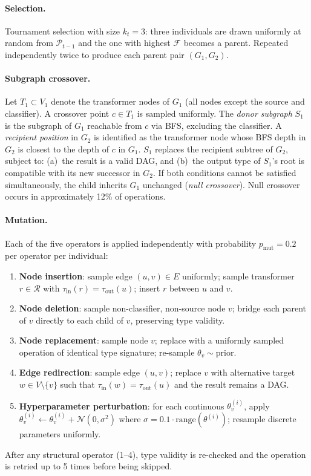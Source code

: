 \documentclass{article}
\theoremstyle{definition}
\theoremstyle{plain}
\theoremstyle{remark}
\begin{document}
\paragraph{Selection.}
Tournament selection with size $k_t = 3$: three individuals are drawn
uniformly at random from $\mathcal{P}_{t-1}$ and the one with highest
$\mathcal{F}$ becomes a parent.
Repeated independently twice to produce each parent pair $(G_1, G_2)$.

\paragraph{Subgraph crossover.}
Let $T_1 \subset V_1$ denote the transformer nodes of $G_1$
(all nodes except the source and classifier).
A crossover point $c \in T_1$ is sampled uniformly.
The \emph{donor subgraph} $S_1$ is the subgraph of $G_1$ reachable from
$c$ via BFS, excluding the classifier.
A \emph{recipient position} in $G_2$ is identified as the transformer node
whose BFS depth in $G_2$ is closest to the depth of $c$ in $G_1$.
$S_1$ replaces the recipient subtree of $G_2$, subject to:
(a)~the result is a valid DAG, and
(b)~the output type of $S_1$'s root is compatible with its new successor in $G_2$.
If both conditions cannot be satisfied simultaneously, the child inherits
$G_1$ unchanged (\emph{null crossover}).
Null crossover occurs in approximately 12\% of operations.

\paragraph{Mutation.}
Each of the five operators is applied independently with probability
$p_{\mathrm{mut}} = 0.2$ per operator per individual:
\begin{enumerate}
  \item \textbf{Node insertion}: sample edge $(u,v) \in E$ uniformly; sample
        transformer $r \in \mathcal{R}$ with $\tau_{\mathrm{in}}(r) =
        \tau_{\mathrm{out}}(u)$; insert $r$ between $u$ and $v$.
  \item \textbf{Node deletion}: sample non-classifier, non-source node $v$;
        bridge each parent of $v$ directly to each child of $v$, preserving
        type validity.
  \item \textbf{Node replacement}: sample node $v$; replace with a uniformly
        sampled operation of identical type signature; re-sample
        $\theta_v \sim \mathrm{prior}$.
  \item \textbf{Edge redirection}: sample edge $(u,v)$; replace $v$ with
        alternative target $w \in V \setminus \{v\}$ such that
        $\tau_{\mathrm{in}}(w) = \tau_{\mathrm{out}}(u)$ and the result
        remains a DAG.
  \item \textbf{Hyperparameter perturbation}: for each continuous
        $\theta^{(i)}_v$, apply $\theta^{(i)}_v \leftarrow \theta^{(i)}_v
        + \mathcal{N}(0, \sigma^2)$ where $\sigma = 0.1\cdot
        \mathrm{range}(\theta^{(i)})$; resample discrete parameters
        uniformly.
\end{enumerate}
After any structural operator (1--4), type validity is re-checked and the
operation is retried up to 5 times before being skipped.
\end{document}
